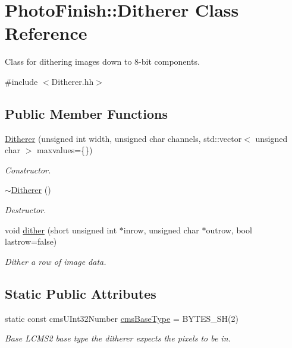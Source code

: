 \hypertarget{class_photo_finish_1_1_ditherer}{}\section{Photo\+Finish\+:\+:Ditherer Class Reference}
\label{class_photo_finish_1_1_ditherer}


Class for dithering images down to 8-\/bit components.  




{\ttfamily \#include $<$Ditherer.\+hh$>$}

\subsection*{Public Member Functions}
\begin{DoxyCompactItemize}
\item 
\hyperlink{class_photo_finish_1_1_ditherer_a93033e318576331f46640f46fa05c99d}{Ditherer} (unsigned int width, unsigned char channels, std\+::vector$<$ unsigned char $>$ maxvalues=\{\})
\begin{DoxyCompactList}\small\item\em Constructor. \end{DoxyCompactList}\item 
\hyperlink{class_photo_finish_1_1_ditherer_ac2c083ce81d17bcad626c19ffdae1c63}{$\sim$\+Ditherer} ()
\begin{DoxyCompactList}\small\item\em Destructor. \end{DoxyCompactList}\item 
void \hyperlink{class_photo_finish_1_1_ditherer_aa58e2a61dc5354ae5a3affafd97f7b06}{dither} (short unsigned int $\ast$inrow, unsigned char $\ast$outrow, bool lastrow=false)
\begin{DoxyCompactList}\small\item\em Dither a row of image data. \end{DoxyCompactList}\end{DoxyCompactItemize}
\subsection*{Static Public Attributes}
\begin{DoxyCompactItemize}
\item 
static const cms\+U\+Int32\+Number \hyperlink{class_photo_finish_1_1_ditherer_a413cdf102c3544bb9535cfa6fe058a63}{cms\+Base\+Type} = B\+Y\+T\+E\+S\+\_\+\+SH(2)
\begin{DoxyCompactList}\small\item\em Base L\+C\+M\+S2 base type the ditherer expects the pixels to be in. \end{DoxyCompactList}\end{DoxyCompactItemize}


